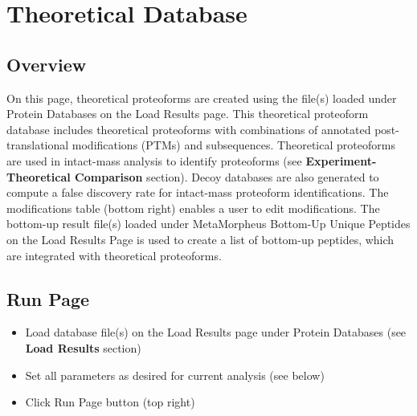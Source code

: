 
\section{Theoretical Database}

\subsection{Overview}
On this page, theoretical proteoforms are created using the file(s) loaded under Protein Databases on the Load Results page. This theoretical proteoform database includes theoretical proteoforms with combinations of annotated post-translational modifications (PTMs) and subsequences. Theoretical proteoforms are used in intact-mass analysis to identify proteoforms (see \textbf{Experiment-Theoretical Comparison} section). Decoy databases are also generated to compute a false discovery rate for intact-mass proteoform identifications. The modifications table (bottom right) enables a user to edit modifications.  The bottom-up result file(s) loaded under MetaMorpheus Bottom-Up Unique Peptides on the Load Results Page is used to create a list of bottom-up peptides, which are integrated with theoretical proteoforms. 

\subsection{Run Page}
\begin{itemize}
\item Load database file(s) on the Load Results page under Protein Databases (see \textbf{Load Results} section)
\item Set all parameters as desired for current analysis (see below)
\item Click Run Page button (top right)
\end{itemize}

